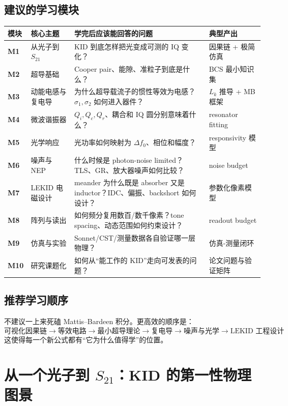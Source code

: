 \documentclass[11pt,a4paper,openany]{ctexrep}
\newcommand{\Stwentyone}{S_{21}}
\begin{document}
\section{建议的学习模块}
\renewcommand{\arraystretch}{1.25}
\begin{tabularx}{\textwidth}{>{\bfseries}p{1.5cm} p{4.0cm} X p{2.6cm}}
\toprule
模块 & 核心主题 & 学完后应该能回答的问题 & 典型产出 \\
\midrule
M1 & 从光子到 $\Stwentyone$ & KID 到底怎样把光变成可测的 IQ 变化？ & 因果链 + 极简仿真 \\
M2 & 超导基础 & Cooper pair、能隙、准粒子到底是什么？ & BCS 最小知识集 \\
M3 & 动能电感与复电导 & 为什么超导载流子的惯性等效为电感？$\sigma_1,\sigma_2$ 如何进入器件？ & $L_k$ 推导 + MB 框架 \\
M4 & 微波谐振器 & $Q_i,Q_c,Q_r$、耦合和 IQ 圆分别意味着什么？ & resonator fitting \\
M5 & 光学响应 & 光功率如何映射为 $\Delta f_0$、相位和幅度？ & responsivity 模型 \\
M6 & 噪声与 NEP & 什么时候是 photon-noise limited？TLS、GR、放大器噪声如何比较？ & noise budget \\
M7 & LEKID 电磁设计 & meander 为什么既是 absorber 又是 inductor？IDC、偏振、backshort 如何设计？ & 参数化像素模型 \\
M8 & 阵列与读出 & 如何频分复用数百/数千像素？tone spacing、动态范围如何约束设计？ & readout budget \\
M9 & 仿真与实验 & Sonnet/CST/测量数据各自验证哪一层物理？ & 仿真-测量闭环 \\
M10 & 研究课题化 & 如何从“能工作的 KID”走向可发表的问题？ & 论文问题与验证矩阵 \\
\bottomrule
\end{tabularx}

\section{推荐学习顺序}
不建议一上来死磕 Mattis--Bardeen 积分。更高效的顺序是：
\[
\boxed{
\text{可视化因果链}
\rightarrow
\text{等效电路}
\rightarrow
\text{最小超导理论}
\rightarrow
\text{复电导}
\rightarrow
\text{噪声与光学}
\rightarrow
\text{LEKID 工程设计}
}
\]
这使得每一个新公式都有“它为什么值得学”的位置。

\chapter{从一个光子到 $S_{21}$：KID 的第一性物理图景}
\end{document}
